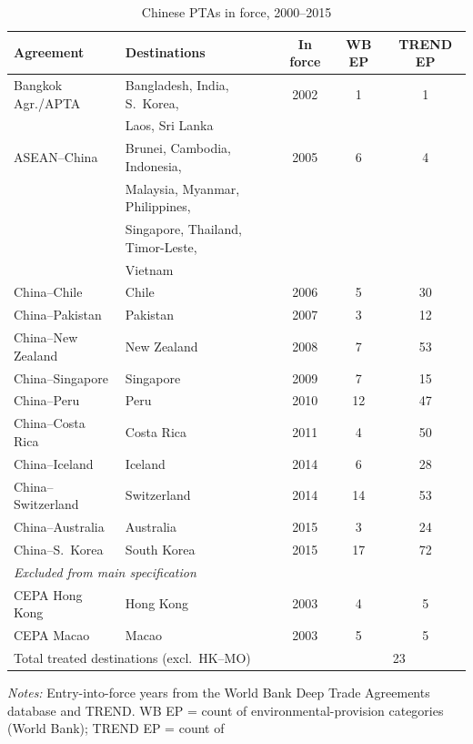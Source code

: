 \documentclass[12pt]{article}
\begin{document}
\begin{table}[htbp]
\centering
\caption{Chinese PTAs in force, 2000--2015}
\label{tab:treatment}
\small
\begin{threeparttable}
\begin{tabular}{llccc}
\toprule
Agreement & Destinations & In force & WB EP & TREND EP \\
\midrule
Bangkok Agr./APTA & Bangladesh, India, S.~Korea, & 2002 & 1 & 1 \\
                  & Laos, Sri Lanka & & & \\
\addlinespace
ASEAN--China & Brunei, Cambodia, Indonesia, & 2005 & 6 & 4 \\
             & Malaysia, Myanmar, Philippines, & & & \\
             & Singapore, Thailand, Timor-Leste, & & & \\
             & Vietnam & & & \\
\addlinespace
China--Chile & Chile & 2006 & 5 & 30 \\
China--Pakistan & Pakistan & 2007 & 3 & 12 \\
China--New Zealand & New Zealand & 2008 & 7 & 53 \\
China--Singapore & Singapore & 2009 & 7 & 15 \\
China--Peru & Peru & 2010 & 12 & 47 \\
China--Costa Rica & Costa Rica & 2011 & 4 & 50 \\
China--Iceland & Iceland & 2014 & 6 & 28 \\
China--Switzerland & Switzerland & 2014 & 14 & 53 \\
China--Australia & Australia & 2015 & 3 & 24 \\
China--S.~Korea & South Korea & 2015 & 17 & 72 \\
\midrule
\multicolumn{5}{l}{\textit{Excluded from main specification}} \\
CEPA Hong Kong & Hong Kong & 2003 & 4 & 5 \\
CEPA Macao & Macao & 2003 & 5 & 5 \\
\midrule
\multicolumn{3}{l}{Total treated destinations (excl.\ HK--MO)} & \multicolumn{2}{c}{23} \\
\bottomrule
\end{tabular}
\begin{tablenotes}\footnotesize
\item \emph{Notes:} Entry-into-force years from the World Bank Deep Trade Agreements database and TREND.
WB EP = count of environmental-provision categories (World Bank); TREND EP = count of

\end{tablenotes}
\end{threeparttable}
\end{table}
\end{document}
